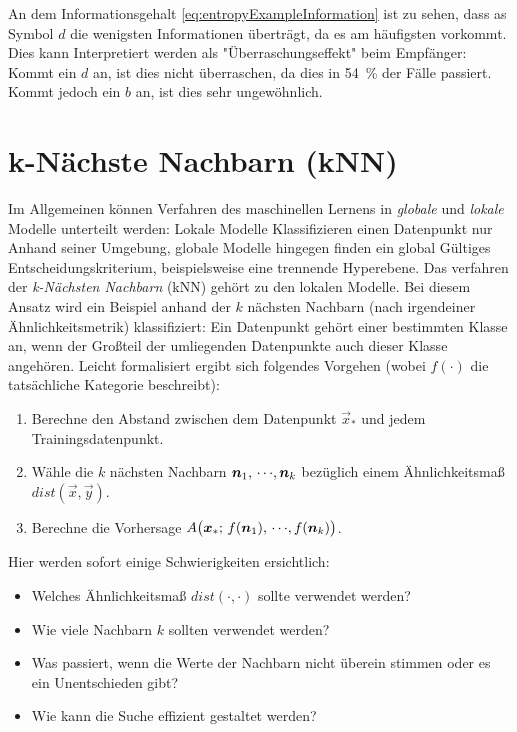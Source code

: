 				An dem Informationsgehalt \eqref{eq:entropyExampleInformation} ist zu sehen, dass as Symbol \(d\) die wenigsten Informationen überträgt, da es am häufigsten vorkommt. Dies kann Interpretiert werden als "Überraschungseffekt" beim Empfänger: Kommt ein \(d\) an, ist dies nicht überraschen, da dies in \SI{54}{\%} der Fälle passiert. Kommt jedoch ein \(b\) an, ist dies sehr ungewöhnlich.

\chapter{k-Nächste Nachbarn (kNN)}
	Im Allgemeinen können Verfahren des maschinellen Lernens in \emph{globale} und \emph{lokale} Modelle unterteilt werden: Lokale Modelle Klassifizieren einen Datenpunkt nur Anhand seiner Umgebung, globale Modelle hingegen finden ein global Gültiges Entscheidungskriterium, beispielsweise eine trennende Hyperebene. Das verfahren der \emph{k-Nächsten Nachbarn} (kNN) gehört zu den lokalen Modelle. Bei diesem Ansatz wird ein Beispiel anhand der \(k\) nächsten Nachbarn (nach irgendeiner Ähnlichkeitsmetrik) klassifiziert: Ein Datenpunkt gehört einer bestimmten Klasse an, wenn der Großteil der umliegenden Datenpunkte auch dieser Klasse angehören. Leicht formalisiert ergibt sich folgendes Vorgehen (wobei \( f(\cdot) \) die tatsächliche Kategorie beschreibt):
	\begin{enumerate}
		\item Berechne den Abstand zwischen dem Datenpunkt \( \vec{x}_\ast \) und jedem Trainingsdatenpunkt.
		\item Wähle die \(k\) nächsten Nachbarn \( \bm{n}_1,\,\cdots\!,\bm{n}_k \) bezüglich einem Ähnlichkeitsmaß \( \mathit{dist}(\vec{x}, \vec{y}) \).
		\item Berechne die Vorhersage \( A\big( \bm{x}_\ast;\, f(\bm{n}_1),\,\cdots\!,f(\bm{n}_k) \big) \).
	\end{enumerate}
	Hier werden sofort einige Schwierigkeiten ersichtlich:
	\begin{itemize}
		\item Welches Ähnlichkeitsmaß \( \mathit{dist}(\cdot, \cdot) \) sollte verwendet werden?
		\item Wie viele Nachbarn \(k\) sollten verwendet werden?
		\item Was passiert, wenn die Werte der Nachbarn nicht überein stimmen oder es ein Unentschieden gibt?
		\item Wie kann die Suche effizient gestaltet werden?
	\end{itemize}

